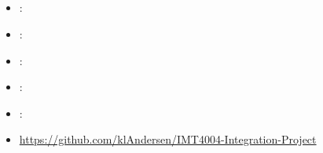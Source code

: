 \subsection[Integration project]{}
\label{sec:key}
\begin{itemize} 
	\item {}: 
	\item {}: 
	\item {}: 
	\item {}: 
	\item {}: 
	\item {} \url{https://github.com/klAndersen/IMT4004-Integration-Project}
\end{itemize} 